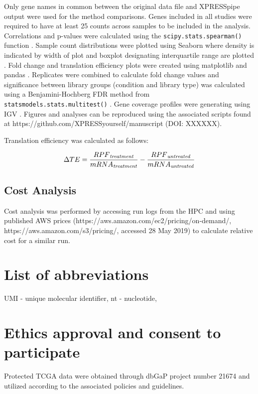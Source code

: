 \documentclass[11pt, a4paper, oneside]{article}
\begin{document}
Only gene names in common between the original data file and XPRESSpipe output were used for the method comparisons. Genes included in all studies were required to have at least 25 counts across samples to be included in the analysis. Correlations and p-values were calculated using the \texttt{scipy.stats.spearman()} function \cite{spearman_rnaseq}. Sample count distributions were plotted using Seaborn where density is indicated by width of plot and boxplot designating interquartile range are plotted \cite{seaborn}. Fold change and translation efficiency plots were created using matplotlib \cite{matplotlib} and pandas \cite{pandas}. Replicates were combined to calculate fold change values and significance between library groups (condition and library type) was calculated using a Benjamini-Hochberg FDR method from \texttt{statsmodels.stats.multitest()} \cite{statsmodels}. Gene coverage profiles were generating using IGV \cite{igv}. Figures and analyses can be reproduced using the associated scripts found at https://github.com/XPRESSyourself/manuscript (DOI: XXXXXX). \par

Translation efficiency was calculated as follows:

\begin{equation}
  \Delta TE = \frac{RPF\textsubscript{\textit{treatment}}}{mRNA\textsubscript{\textit{treatment}}} - \frac{RPF\textsubscript{\textit{untreated}}}{mRNA\textsubscript{\textit{untreated}}}
\end{equation}

\subsection{Cost Analysis}
Cost analysis was performed by accessing run logs from the HPC and using published AWS prices (https://aws.amazon.com/ec2/pricing/on-demand/, https://aws.amazon.com/s3/pricing/, accessed 28 May 2019) to calculate relative cost for a similar run.

\section*{List of abbreviations}
UMI - unique molecular identifier, nt - nucleotide,

\section*{Ethics approval and consent to participate}
Protected TCGA data were obtained through dbGaP project number 21674 and utilized according to the associated policies and guidelines.
\end{document}
